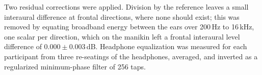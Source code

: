 Two residual corrections were applied. Division by the reference leaves a
small interaural difference at frontal directions, where none should exist;
this was removed by equating broadband energy between the ears over 200\,Hz to
16\,kHz, one scalar per direction, which on the manikin left a frontal
interaural level difference of $0.000 \pm 0.003$\,dB. Headphone equalization
was measured for each participant from three re-seatings of the headphones,
averaged, and inverted as a regularized minimum-phase filter of 256 taps.

